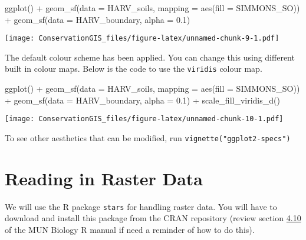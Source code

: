 \documentclass[
]{book}
\newenvironment{Shaded}{\begin{snugshade}}{\end{snugshade}}
\newcommand{\AttributeTok}[1]{\textcolor[rgb]{0.77,0.63,0.00}{#1}}
\newcommand{\FloatTok}[1]{\textcolor[rgb]{0.00,0.00,0.81}{#1}}
\newcommand{\FunctionTok}[1]{\textcolor[rgb]{0.00,0.00,0.00}{#1}}
\newcommand{\NormalTok}[1]{#1}
\newcommand{\SpecialCharTok}[1]{\textcolor[rgb]{0.00,0.00,0.00}{#1}}
\begin{document}
\begin{Shaded}
\begin{Highlighting}[]
\FunctionTok{ggplot}\NormalTok{() }\SpecialCharTok{+}
  \FunctionTok{geom\_sf}\NormalTok{(}\AttributeTok{data =}\NormalTok{ HARV\_soils, }\AttributeTok{mapping =} \FunctionTok{aes}\NormalTok{(}\AttributeTok{fill =}\NormalTok{ SIMMONS\_SO)) }\SpecialCharTok{+} 
  \FunctionTok{geom\_sf}\NormalTok{(}\AttributeTok{data =}\NormalTok{ HARV\_boundary, }\AttributeTok{alpha =} \FloatTok{0.1}\NormalTok{)}
\end{Highlighting}
\end{Shaded}

\texttt{[image: ConservationGIS\_files/figure-latex/unnamed-chunk-9-1.pdf]}

The default colour scheme has been applied. You can change this using different built in colour maps. Below is the code to use the \texttt{viridis} colour map.

\begin{Shaded}
\begin{Highlighting}[]
\FunctionTok{ggplot}\NormalTok{() }\SpecialCharTok{+}
  \FunctionTok{geom\_sf}\NormalTok{(}\AttributeTok{data =}\NormalTok{ HARV\_soils, }\AttributeTok{mapping =} \FunctionTok{aes}\NormalTok{(}\AttributeTok{fill =}\NormalTok{ SIMMONS\_SO)) }\SpecialCharTok{+} 
  \FunctionTok{geom\_sf}\NormalTok{(}\AttributeTok{data =}\NormalTok{ HARV\_boundary, }\AttributeTok{alpha =} \FloatTok{0.1}\NormalTok{) }\SpecialCharTok{+}
  \FunctionTok{scale\_fill\_viridis\_d}\NormalTok{()}
\end{Highlighting}
\end{Shaded}

\texttt{[image: ConservationGIS\_files/figure-latex/unnamed-chunk-10-1.pdf]}

To see other aesthetics that can be modified, run \texttt{vignette("ggplot2-specs")}

\hypertarget{raster}{%
\chapter{Reading in Raster Data}\label{raster}}

We will use the R package \texttt{stars} for handling raster data. You will have to download and install this package from the CRAN repository (review section \href{https://ahurford.github.io/quant-guide-all-courses/rintro.html\#r-packages}{4.10} of the MUN Biology R manual if need a reminder of how to do this).
\end{document}
